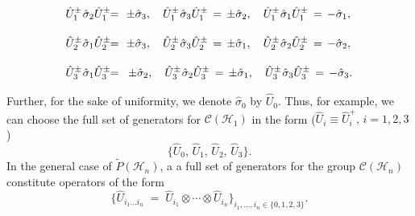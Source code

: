 \documentclass[12pt,a4paper,twoside]{article}      %
\begin{document}
\begin{eqnarray}\label{}
\hat{U}_1^\pm\:\!\hat{\sigma}_{2}\hat{U}_1^\pm &\!\!=\!\!& \pm\hat{\sigma}_{3},\quad \hat{U}_1^\pm\:\!\hat{\sigma}_{3}\hat{U}_1^\pm\,=\, \pm\hat{\sigma}_{2}, \quad \hat{U}_1^\pm\:\!\hat{\sigma}_{1}\hat{U}_1^\pm\,=\, -\hat{\sigma}_{1}, \vphantom{\int}
\nonumber\\
\hat{U}_2^\pm\:\!\hat{\sigma}_{1}\hat{U}_2^\pm &\!\!=\!\!& \pm\hat{\sigma}_{3},\quad \hat{U}_2^\pm\:\!\hat{\sigma}_{3}\hat{U}_2^\pm\,=\, \pm\hat{\sigma}_{1}, \quad \hat{U}_2^\pm\:\!\hat{\sigma}_{2}\hat{U}_2^\pm\,=\, -\hat{\sigma}_{2}, \vphantom{\int}
\nonumber\\
\hat{U}_3^\pm\:\!\hat{\sigma}_{1}\hat{U}_3^\pm
&\!\!=\!\!& \pm\hat{\sigma}_{2},\quad \hat{U}_3^\pm\:\!\hat{\sigma}_{2}\hat{U}_3^\pm\,=\, \pm\hat{\sigma}_{1}, \quad \hat{U}_3^\pm\:\!\hat{\sigma}_{3}\hat{U}_3^\pm\,=\, -\hat{\sigma}_{3}. \vphantom{\int}
\nonumber
\end{eqnarray}
\label{A2}\noindent
Further, for the sake of uniformity, we denote $\hat{\sigma}_{0}$ by $\hat{U}_0$. Thus, for example, we can choose the full set of generators for $\mathcal{C}(\mathcal{H}_1)$ in the form ($\hat{U}_{i}\equiv\hat{U}_{i}^+,\, i=1,2,3$)
\begin{equation}\label{}
\big\{ \hat{U}_0,\, \hat{U}_{1},\, \hat{U}_{2}, \,\hat{U}_{3} \big\}.
\nonumber
\end{equation}
In the general case of $\widetilde{P}(\mathcal{H}_n)$, a a full set of generators for the group $\mathcal{C}(\mathcal{H}_n)$ constitute operators of the form
\begin{equation}\label{}
\big\{\hat{U}_{i_1\ldots{}i_n}\;=\; \hat{U}_{i_1}\otimes\cdots \otimes \hat{U}_{i_n}\big\}_{i_1,\ldots,i_n\in\{0,1,2,3\}}.
\nonumber
\end{equation}
\end{document}
